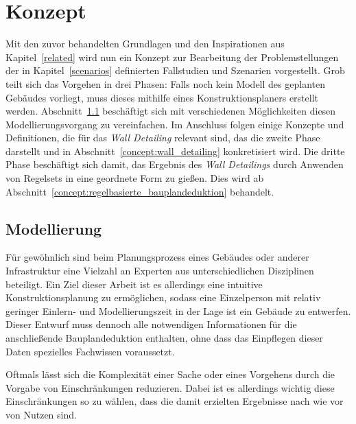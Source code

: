 \chapter{Konzept}\label{concept}
Mit den zuvor behandelten Grundlagen und den Inspirationen aus Kapitel~\ref{related} wird nun ein Konzept zur Bearbeitung der Problemstellungen der in Kapitel~\ref{scenarios} definierten Fallstudien und Szenarien vorgestellt.
Grob teilt sich das Vorgehen in drei Phasen:
Falls noch kein Modell des geplanten Gebäudes vorliegt, muss dieses mithilfe eines Konstruktionsplaners erstellt werden.
Abschnitt~\ref{concept:modellierung} beschäftigt sich mit verschiedenen Möglichkeiten diesen Modellierungsvorgang zu vereinfachen.
Im Anschluss folgen einige Konzepte und Definitionen, die für das \textit{Wall Detailing} relevant sind, das die zweite Phase darstellt und in Abschnitt~\ref{concept:wall_detailing} konkretisiert wird.
Die dritte Phase beschäftigt sich damit, das Ergebnis des \textit{Wall Detailings} durch Anwenden von Regelsets in eine geordnete Form zu gießen.
Dies wird ab Abschnitt~\ref{concept:regelbasierte_bauplandeduktion} behandelt.

\section{Modellierung}\label{concept:modellierung}
Für gewöhnlich sind beim Planungsprozess eines Gebäudes oder anderer Infrastruktur eine Vielzahl an Experten aus unterschiedlichen Disziplinen beteiligt.
Ein Ziel dieser Arbeit ist es allerdings eine intuitive Konstruktionsplanung zu ermöglichen, sodass eine Einzelperson mit relativ geringer Einlern- und Modellierungszeit in der Lage ist ein Gebäude zu entwerfen.
Dieser Entwurf muss dennoch alle notwendigen Informationen für die anschließende Bauplandeduktion enthalten, ohne dass das Einpflegen dieser Daten spezielles Fachwissen voraussetzt.

Oftmals lässt sich die Komplexität einer Sache oder eines Vorgehens durch die Vorgabe von Einschränkungen reduzieren.
Dabei ist es allerdings wichtig diese Einschränkungen so zu wählen, dass die damit erzielten Ergebnisse nach wie vor von Nutzen sind.

